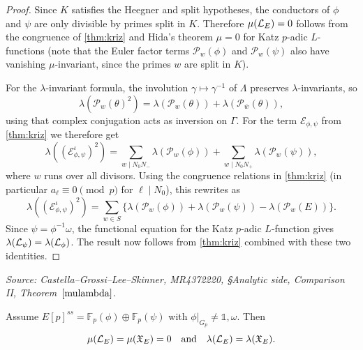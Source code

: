 \begin{proof}
  Since \(K\) satisfies the Heegner and split hypotheses, the conductors of \(\phi\) and \(\psi\) are only divisible by primes split in \(K\). Therefore \(\mu(\mathcal{L}_E) = 0\) follows from the congruence of \cref{thm:kriz} and Hida's theorem \(\mu = 0\) for Katz \(p\)-adic \(L\)-functions (note that the Euler factor terms \(\mathcal{P}_w(\phi)\) and \(\mathcal{P}_w(\psi)\) also have vanishing \(\mu\)-invariant, since the primes \(w\) are split in \(K\)).

  For the \(\lambda\)-invariant formula, the involution \(\gamma\mapsto\gamma^{-1}\) of \(\Lambda\) preserves \(\lambda\)-invariants, so
  \[
    \lambda(\mathcal{P}_w(\theta)^2) = \lambda(\mathcal{P}_w(\theta)) + \lambda(\mathcal{P}_{\bar{w}}(\theta)),
  \]
  using that complex conjugation acts as inversion on \(\Gamma\). For the term \(\mathcal{E}_{\phi,\psi}\) from \cref{thm:kriz} we therefore get
  \[
    \lambda((\mathcal{E}_{\phi,\psi}^\iota)^2)
    = \sum_{w\mid N_0 N_-}\lambda(\mathcal{P}_w(\phi)) + \sum_{w\mid N_0 N_+}\lambda(\mathcal{P}_w(\psi)),
  \]
  where \(w\) runs over all divisors. Using the congruence relations in \cref{thm:kriz} (in particular \(a_\ell\equiv 0\pmod{p}\) for \(\ell\mid N_0\)), this rewrites as
  \[
    \lambda((\mathcal{E}_{\phi,\psi}^\iota)^2)
    = \sum_{w\in S}\bigl\{\lambda(\mathcal{P}_w(\phi)) + \lambda(\mathcal{P}_w(\psi)) - \lambda(\mathcal{P}_w(E))\bigr\}.
  \]
  Since \(\psi = \phi^{-1}\omega\), the functional equation for the Katz \(p\)-adic \(L\)-function gives \(\lambda(\mathcal{L}_\psi) = \lambda(\mathcal{L}_\phi)\). The result now follows from \cref{thm:kriz} combined with these two identities.
\end{proof}

\begin{theorem}
  \label{mulambda}
  \textit{Source: Castella--Grossi--Lee--Skinner, MR4372220, §Analytic side, Comparison II, Theorem~\(\ref{mulambda}\).}

  Assume \(E[p]^{ss} = \mathbb{F}_p(\phi)\oplus\mathbb{F}_p(\psi)\) with \(\phi|_{G_p}\neq\mathds{1},\omega\). Then
  \[
    \mu(\mathcal{L}_E) = \mu(\mathfrak{X}_E) = 0
    \quad\text{and}\quad
    \lambda(\mathcal{L}_E) = \lambda(\mathfrak{X}_E).
  \]
\end{theorem}


